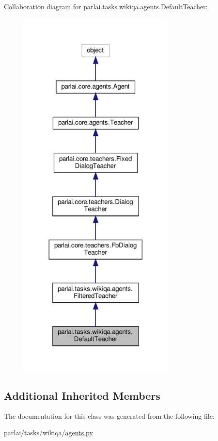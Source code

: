 Collaboration diagram for parlai.\+tasks.\+wikiqa.\+agents.\+Default\+Teacher\+:
\nopagebreak
\begin{figure}[H]
\begin{center}
\leavevmode
\includegraphics[width=224pt]{classparlai_1_1tasks_1_1wikiqa_1_1agents_1_1DefaultTeacher__coll__graph}
\end{center}
\end{figure}
\subsection*{Additional Inherited Members}


The documentation for this class was generated from the following file\+:\begin{DoxyCompactItemize}
\item 
parlai/tasks/wikiqa/\hyperlink{parlai_2tasks_2wikiqa_2agents_8py}{agents.\+py}\end{DoxyCompactItemize}
